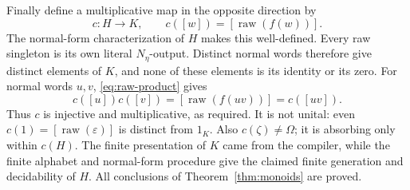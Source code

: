 Finally define a multiplicative map in the opposite direction by
\[
 c:H\longrightarrow K,\qquad c([w])=[\operatorname{raw}(f(w))].
\]
The normal-form characterization of $H$ makes this well-defined.
Every raw singleton is its own literal $N_\eta$-output.  Distinct
normal words therefore give distinct elements of $K$, and none of
these elements is its identity or its zero.  For normal words $u,v$,
\eqref{eq:raw-product} gives
\[
 c([u])c([v])=[\operatorname{raw}(f(uv))]=c([uv]).
\]
Thus $c$ is injective and multiplicative, as required.  It is not
unital: even $c(1)=[\operatorname{raw}(\varepsilon)]$ is distinct from $1_K$.
Also $c(\zeta)\ne\Omega$; it is absorbing only within $c(H)$.
The finite presentation of $K$ came from the compiler, while the
finite alphabet and normal-form procedure give the claimed finite
generation and decidability of $H$.  All conclusions of
Theorem~\ref{thm:monoids} are proved.
